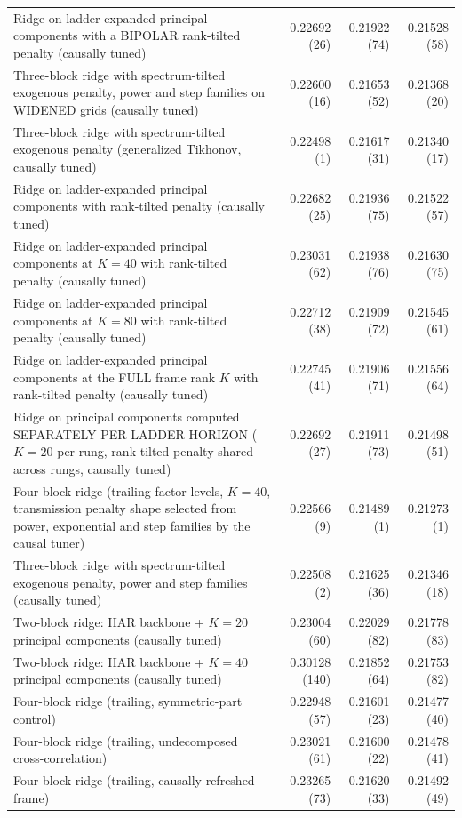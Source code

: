 \begin{longtable}{p{}rrr}
Ridge on ladder-expanded principal components with a BIPOLAR rank-tilted penalty (causally tuned) & 0.22692 (26) & 0.21922 (74) & 0.21528 (58) \\
Three-block ridge with spectrum-tilted exogenous penalty, power and step families on WIDENED grids (causally tuned) & 0.22600 (16) & 0.21653 (52) & 0.21368 (20) \\
Three-block ridge with spectrum-tilted exogenous penalty (generalized Tikhonov, causally tuned) & 0.22498 (1) & 0.21617 (31) & 0.21340 (17) \\
Ridge on ladder-expanded principal components with rank-tilted penalty (causally tuned) & 0.22682 (25) & 0.21936 (75) & 0.21522 (57) \\
Ridge on ladder-expanded principal components at $K=40$ with rank-tilted penalty (causally tuned) & 0.23031 (62) & 0.21938 (76) & 0.21630 (75) \\
Ridge on ladder-expanded principal components at $K=80$ with rank-tilted penalty (causally tuned) & 0.22712 (38) & 0.21909 (72) & 0.21545 (61) \\
Ridge on ladder-expanded principal components at the FULL frame rank $K$ with rank-tilted penalty (causally tuned) & 0.22745 (41) & 0.21906 (71) & 0.21556 (64) \\
Ridge on principal components computed SEPARATELY PER LADDER HORIZON ($K=20$ per rung, rank-tilted penalty shared across rungs, causally tuned) & 0.22692 (27) & 0.21911 (73) & 0.21498 (51) \\
Four-block ridge (trailing factor levels, $K=40$, transmission penalty shape selected from power, exponential and step families by the causal tuner) & 0.22566 (9) & 0.21489 (1) & 0.21273 (1) \\
Three-block ridge with spectrum-tilted exogenous penalty, power and step families (causally tuned) & 0.22508 (2) & 0.21625 (36) & 0.21346 (18) \\
Two-block ridge: HAR backbone + $K=20$ principal components (causally tuned) & 0.23004 (60) & 0.22029 (82) & 0.21778 (83) \\
Two-block ridge: HAR backbone + $K=40$ principal components (causally tuned) & 0.30128 (140) & 0.21852 (64) & 0.21753 (82) \\
Four-block ridge (trailing, symmetric-part control) & 0.22948 (57) & 0.21601 (23) & 0.21477 (40) \\
Four-block ridge (trailing, undecomposed cross-correlation) & 0.23021 (61) & 0.21600 (22) & 0.21478 (41) \\
Four-block ridge (trailing, causally refreshed frame) & 0.23265 (73) & 0.21620 (33) & 0.21492 (49) \\

\end{longtable}
